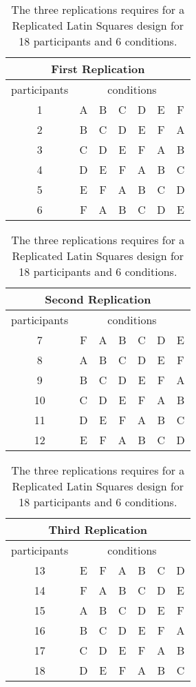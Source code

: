\begin{table}[h] %
	\centering
	\caption[Replicated Latin Squares Example]{\centering The three replications requires for a Replicated Latin Squares design for 18 participants and 6 conditions.}
	\label{final_latin_squares_rep}
	\begin{tabular}{c | c c c c c c}
		\multicolumn{7}{c}{First Replication} \\
		\hline
		participants & \multicolumn{6}{c}{conditions} \\
		\hline
		1 & A & B & C & D & E & F \\
		2 & B & C & D & E & F & A \\
		3 & C & D & E & F & A & B \\
		4 & D & E & F & A & B & C \\
		5 & E & F & A & B & C & D \\
		6 & F & A & B & C & D & E \\
		\hline
	\end{tabular}
	
	\vspace*{5mm}
	
	\begin{tabular}{c | c c c c c c}
		\multicolumn{7}{c}{Second Replication} \\
		\hline
		participants & \multicolumn{6}{c}{conditions} \\
		\hline
		7 & F & A & B & C & D & E \\
		8 & A & B & C & D & E & F \\
		9 & B & C & D & E & F & A \\
		10 & C & D & E & F & A & B \\
		11 & D & E & F & A & B & C \\
		12 & E & F & A & B & C & D \\
		\hline
	\end{tabular}
	
	\vspace*{5mm}
	
	\begin{tabular}{c | c c c c c c}
		\multicolumn{7}{c}{Third Replication} \\
		\hline
		participants & \multicolumn{6}{c}{conditions} \\
		\hline
		13 & E & F & A & B & C & D \\
		14 & F & A & B & C & D & E \\
		15 & A & B & C & D & E & F \\
		16 & B & C & D & E & F & A \\
		17 & C & D & E & F & A & B \\
		18 & D & E & F & A & B & C \\
		\hline
	\end{tabular}
\end{table}

